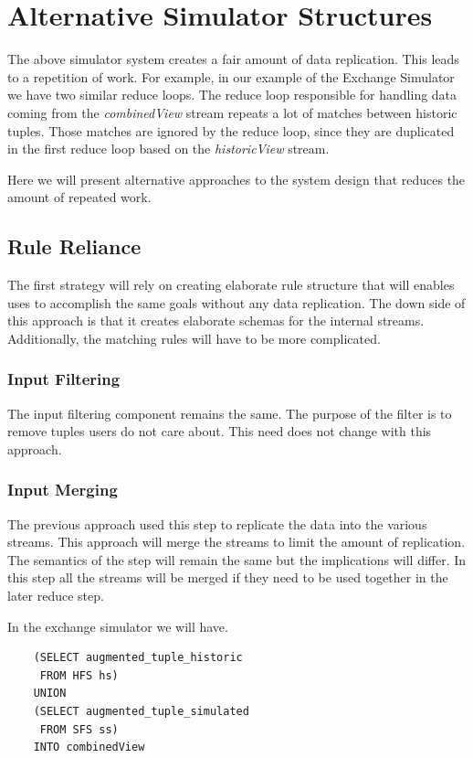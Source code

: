 \documentclass{article}
\begin{document}
\section{Alternative Simulator Structures}

The above simulator system creates a fair amount of data replication. This leads to a repetition of work. For example, in our example of the Exchange Simulator we have two similar reduce loops. The reduce loop responsible for handling data coming from the \emph{combinedView} stream repeats a lot of matches between historic tuples. Those matches are ignored by the reduce loop, since they are duplicated in the first reduce loop based on the \emph{historicView} stream. 

Here we will present alternative approaches to the system design that reduces the amount of repeated work. 

\subsection{Rule Reliance}
The first strategy will rely on creating elaborate rule structure that will enables uses to accomplish the same goals without any data replication. The down side of this approach is that it creates elaborate schemas for the internal streams. Additionally, the matching rules will have to be more complicated.  

\subsubsection{Input Filtering}

The input filtering component remains the same. The purpose of the filter is to remove tuples users do not care about. This need does not change with this approach. 

\subsubsection{Input Merging}

The previous approach used this step to replicate the data into the various streams. This approach will merge the streams to limit the amount of replication. The semantics of the step will remain the same but the implications will differ. In this step all the streams will be merged if they need to be used together in the later reduce step.


In the exchange simulator we will have. 
\begin{verbatim}
    (SELECT augmented_tuple_historic
     FROM HFS hs)
    UNION
    (SELECT augmented_tuple_simulated
     FROM SFS ss)
    INTO combinedView 
\end{verbatim}
\end{document}
